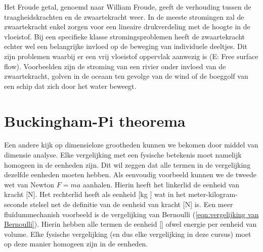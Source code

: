 Het Froude getal, genoemd naar William Froude, geeft de verhouding tussen de traagheidskrachten en de zwaartekracht weer. In de meeste stromingen zal de zwaartekracht enkel zorgen voor een lineaire drukverdeling met de hoogte in de vloeistof. Bij een specifieke klasse stromingsproblemen heeft de zwaartekracht echter wel een belangrijke invloed op de beweging van individuele deeltjes. Dit zijn problemen waarbij er een vrij vloeistof oppervlak aanwezig is (E: Free surface flow). Voorbeelden zijn de stroming van een rivier onder invloed van de zwaartekracht, golven in de oceaan ten gevolge van de wind of de boeggolf van een schip dat zich door het water beweegt.

	\section{Buckingham-Pi theorema}
Een andere kijk op dimensieloze grootheden kunnen we bekomen door middel van dimensie analyse. Elke vergelijking met een fysische betekenis moet namelijk homogeen in de eenheden zijn. Dit wil zeggen dat alle termen in de vergelijking dezelfde eenheden moeten hebben. Als eenvoudig voorbeeld kunnen we de tweede wet van Newton $F=ma$ aanhalen. Hierin heeft het linkerlid de eenheid van kracht [\unit{}{N}]. Het rechterlid heeft als eenheid [\unit{}{kg }] wat in het meter-kilogram-seconde stelsel net de definitie van de eenheid van kracht [\unit{}{N}] is. Een meer fluïdummechanish voorbeeld is de vergelijking van Bernoulli (\ref{eqn:vergelijking van Bernoulli}). Hierin hebben alle termen de eenheid [\unit{}{}] ofwel energie per eenheid van volume. Elke fysische vergelijking (en dus elke vergelijking in deze cursus) moet op deze manier homogeen zijn in de eenheden.

